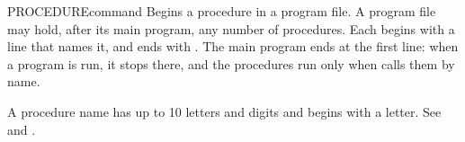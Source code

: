\begin{XbaseEntry}{PROCEDURE}{command}
Begins a procedure in a program file.
\Syntax
{}
\Usage
A program file may hold, after its main program, any number of procedures.
Each begins with a  line that names it, and ends with
.  The main program ends at the first  line: when a
program is run, it stops there, and the procedures run only when
 calls them by name.

A procedure name has up to 10 letters and digits and begins with a letter.
\Examples
See  and .
\end{XbaseEntry}

